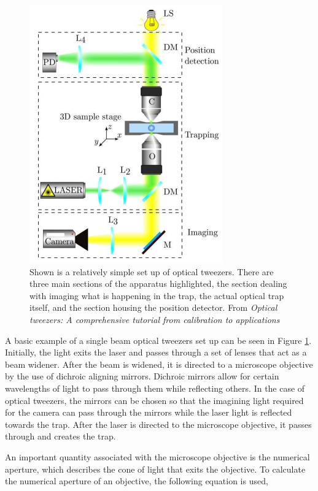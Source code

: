 \documentclass[%
 aip,
 amsmath,amssymb,
 reprint,%
]{revtex4-1}
\begin{document}
\begin{figure}[h]
    \centering
    \includegraphics[scale=.85]{OT.PNG}
    \caption{Shown is a relatively simple set up of optical tweezers. There are three main sections of the apparatus highlighted, the section dealing with imaging what is happening in the trap, the actual optical trap itself, and the section housing the position detector. From \textit{Optical tweezers: A comprehensive tutorial from calibration to applications}\cite{ot}}
    \label{fig:OT}
\end{figure}

    A basic example of a single beam optical tweezers set up can be seen in Figure \ref{fig:OT}. Initially, the light exits the laser and passes through a set of lenses that act as a beam widener. After the beam is widened, it is directed to a microscope objective by the use of dichroic aligning mirrors. Dichroic mirrors allow for certain wavelengths of light to pass through them while reflecting others. In the case of optical tweezers, the mirrors can be chosen so that the imagining light required for the camera can pass through the mirrors while the laser light is reflected towards the trap. After the laser is directed to the microscope objective, it passes through and creates the trap\cite{tut}. 
    
    An important quantity associated with the microscope objective is the numerical aperture, which describes the cone of light that exits the objective. To calculate the numerical aperture of an objective, the following equation is used,
    
\end{document}
